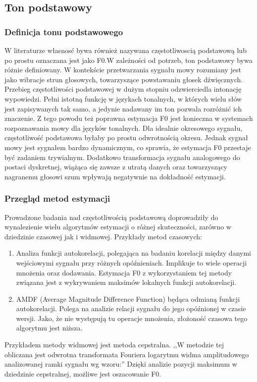 \documentclass[a4paper,12 pt]{article}
\begin{document}
\subsection{Ton podstawowy}

\subsubsection{Definicja tonu podstawowego}
W literaturze własnosć bywa również nazywana częstotliwoscią podstawową lub po prostu oznaczana jest jako F0.W zależności od potrzeb, ton podstawowy bywa różnie definiowany. W kontekście przetwarzania sygnału  mowy rozumiany jest jako wibracje strun głosowych, towarzyszące powstawaniu głosek dźwięcznych. Przebieg częstotliwości podstawowej w dużym stopniu odzwierciedla intonację wypowiedzi. Pełni istotną funkcję w językach tonalnych, w których wielu słów jest zapisywanych tak samo, a jedynie nadawany im ton pozwala rozróżnić ich znaczenie. Z tego powodu też poprawna estymacja F0 jest konieczna w systemach rozpoznawania mowy dla języków tonalnych.
Dla idealnie okresowego sygnału, częstotliwość podstawowa byłaby po prostu odwrotnością okresu. Jednak sygnał mowy jest sygnałem bardzo dynamicznym, co sprawia, że estymacja F0 przestaje być zadaniem trywialnym. Dodatkowo transformacja sygnału analogowego do postaci dyskretnej, wiążąca się zawsze z utratą danych oraz towarzyszący nagranemu głosowi szum wpływają negatywnie na dokładność estymacji. 
\subsubsection{Przegląd metod estymacji}
Prowadzone badania nad częstotliwością podstawową doprowadziły do wynalezienie wielu algorytmów estymacji o różnej skuteczności, zarówno w dziedzinie czasowej jak i widmowej.
Przykłady metod czasowych:
\begin{enumerate}
\item Analiza funkcji autokorelacji, polegająca na badaniu korelacji między danymi wejściowymi sygnału przy różnych opóźnieniach. Implikuje to wiele operacji mnożenia oraz dodawania. Estymacja F0 z wykorzystaniem tej metody związana jest z wykrywaniem maksimów lokalnych funkcji autokorelacji.
\item AMDF (Average Magnitude Difference Function) będąca odmianą funkcji autokorelacji. Polega na analizie relacji sygnału do jego opóźnionej w czasie wersji. Jako, że nie występują tu operacje mnożenia, złożoność czasowa tego algorytmu jest niższa.
\end{enumerate}
Przykładem metody widmowej jest metoda cepstralna.
,,W metodzie tej obliczana  jest odwrotna transformata Fouriera logarytmu widma amplitudowego analizowanej ramki sygnału wg wzoru:''
Dzięki analizie pozycji maksimum w dziedzinie cepstralnej, możliwe jest oszacowanie F0.
\end{document}
